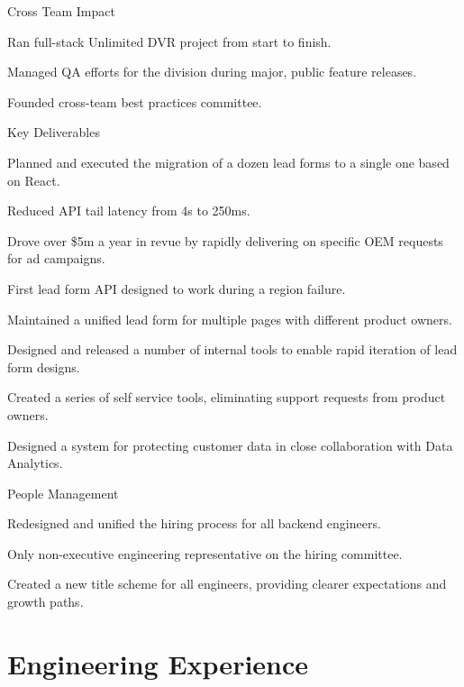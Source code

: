 \documentclass[]{deedy-resume-openfont}
\begin{document}
Cross Team Impact
\begin{tightemize}
\item Ran full-stack Unlimited DVR project from start to finish.
\item Managed QA efforts for the division during major, public feature releases.
\item Founded cross-team best practices committee.
\end{tightemize}
\sectionsep

\vspace{\topsep}
Key Deliverables
\begin{tightemize}
\item Planned and executed the migration of a dozen lead forms to a single one based on React.
\item Reduced API tail latency from 4s to 250ms.
\item Drove over \$5m a year in revue by rapidly delivering on specific OEM requests for ad campaigns.
\item First lead form API designed to work during a region failure.
\item Maintained a unified lead form for multiple pages with different product owners.
\item Designed and released a number of internal tools to enable rapid iteration of lead form designs.
\item Created a series of self service tools, eliminating support requests from product owners.
\item Designed a system for protecting customer data in close collaboration with Data Analytics.
\end{tightemize}
\sectionsep
People Management
\begin{tightemize}
  \item Redesigned and unified the hiring process for all backend engineers.
  \item Only non-executive engineering representative on the hiring committee.
  \item Created a new title scheme for all engineers, providing clearer expectations and growth paths.
\end{tightemize}

\pagebreak

\section{Engineering Experience}
\end{document}
